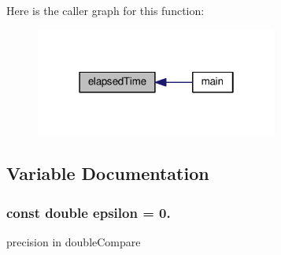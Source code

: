 Here is the caller graph for this function\-:
\nopagebreak
\begin{figure}[H]
\begin{center}
\leavevmode
\includegraphics[width=226pt]{utility_8hh_affb98702b6d646743be567444260ac1f_icgraph}
\end{center}
\end{figure}




\subsection{Variable Documentation}
\hypertarget{utility_8hh_ac29df3dcbefa1ce189e5990bde994025}{
\subsubsection[{epsilon}]{\setlength{\rightskip}{0pt plus 5cm}const double epsilon = 0.}}\label{utility_8hh_ac29df3dcbefa1ce189e5990bde994025}


precision in double\-Compare 

